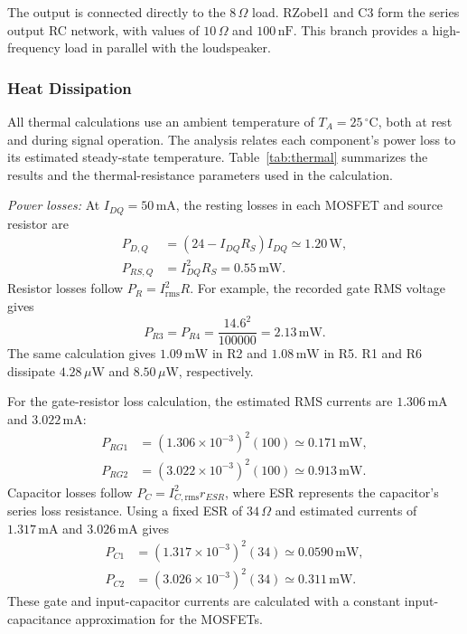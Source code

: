 \documentclass[conference,letterpaper]{IEEEtran}
\newcommand{\Ohm}{\Omega}
\newcommand{\nF}{\mathrm{nF}}
\newcommand{\W}{\mathrm{W}}
\begin{document}
The output is connected directly to the $8\,\Ohm$ load. RZobel1
and C3 form the series output RC network, with values of
$10\,\Ohm$ and $100\,\nF$. This branch provides a high-frequency
load in parallel with the loudspeaker.

\subsubsection{Heat Dissipation}
All thermal calculations use an ambient temperature of
$T_A=25\,{}^\circ\mathrm{C}$, both at rest and during signal operation.
The analysis relates each component's power loss to its estimated
steady-state temperature. Table~\ref{tab:thermal} summarizes the
results and the thermal-resistance parameters used in the calculation.

\emph{Power losses:}
At $I_{DQ}=50\,\mathrm{mA}$, the resting losses in each MOSFET
and source resistor are
\begin{align}
P_{D,Q}&=(24-I_{DQ}R_S)I_{DQ}\simeq1.20\,\W,\\
P_{RS,Q}&=I_{DQ}^{2}R_S=0.55\,\mathrm{mW}.
\end{align}
Resistor losses follow $P_R=I_{\mathrm{rms}}^2R$. For example,
the recorded gate RMS voltage gives
\begin{equation}
P_{R3}=P_{R4}=\frac{14.6^2}{100000}=2.13\,\mathrm{mW}.
\end{equation}
The same calculation gives $1.09\,\mathrm{mW}$ in R2 and
$1.08\,\mathrm{mW}$ in R5. R1 and R6 dissipate
$4.28\,\mu\W$ and $8.50\,\mu\W$, respectively.

For the gate-resistor loss calculation, the estimated RMS currents
are $1.306\,\mathrm{mA}$ and $3.022\,\mathrm{mA}$:
\begin{align}
P_{RG1}&=(1.306\times10^{-3})^2(100)
\simeq0.171\,\mathrm{mW},\\
P_{RG2}&=(3.022\times10^{-3})^2(100)
\simeq0.913\,\mathrm{mW}.
\end{align}
Capacitor losses follow $P_C=I_{C,\mathrm{rms}}^2r_{ESR}$,
where ESR represents the capacitor's series loss resistance.
Using a fixed ESR of $34\,\Ohm$ and estimated currents of
$1.317\,\mathrm{mA}$ and $3.026\,\mathrm{mA}$ gives
\begin{align}
P_{C1}&=(1.317\times10^{-3})^2(34)
\simeq0.0590\,\mathrm{mW},\\
P_{C2}&=(3.026\times10^{-3})^2(34)
\simeq0.311\,\mathrm{mW}.
\end{align}
These gate and input-capacitor currents are calculated with a
constant input-capacitance approximation for the MOSFETs.
\end{document}
